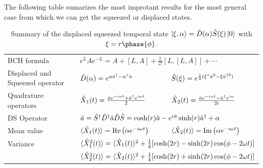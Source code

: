 The following table sumarizes the most improtant 
results for the most general case from which we can get the squeezed or displaced states.
\begin{table}[htbp]
    \caption{Summary of the displaced squeezed temporal state $\left|\xi,\alpha\right\rangle=\hat{D}(\alpha)\hat{S}(\xi)\left|0\right\rangle$ with $\xi=r\phase{\phi}$.}
    \centering
    \begin{tabular}{l|ll}
        BCH formula&\multicolumn{2}{l}{$e^LAe^{-L}=A+[L,A]+\frac{1}{2!}[L,[L,A]]+\cdots$}\\
        Displaced and Squeezed operator&$\hat{D}(\alpha)=e^{\alpha\hat{a}^\dagger-\alpha^*\hat{a}}$&$\hat{S}(\xi)=e^{\frac{1}{2}(\xi^*\hat{a}^2-\xi\hat{a}^{\dagger2})}$\\
        Quadrature operators&$\hat{X}_1(t)=\frac{\hat{a} e^{-i\omega t}+\hat{a}^\dagger e^{i\omega t}}{2}$&$\hat{X}_2(t)=\frac{\hat{a} e^{-i\omega t}-\hat{a}^\dagger e^{i\omega}}{2i}$\\
        DS Operator&\multicolumn{2}{l}{$\tilde{a}=\hat{S}^\dagger\hat{D}^\dagger\hat{a}\hat{D}\hat{S}=\cosh(r)\hat{a}-e^{i\phi}\sinh(r)\hat{a}^\dagger+\alpha$}\\
        Mean value&$\langle\hat{X}_1(t)\rangle=\text{Re}\left(\alpha e^{-i\omega t}\right)$&$\langle\hat{X}_2(t)\rangle=\text{Im}\left(\alpha e^{-i\omega t}\right)$\\
        Variance&\multicolumn{2}{l}{$\langle\hat{X}_1^2(t)\rangle=\langle\hat{X}_1(t)\rangle^2+\frac{1}{4}[\cosh(2r)-\sinh(2r)\cos(\phi-2\omega t)]$}\\
        &\multicolumn{2}{l}{$\langle\hat{X}_2^2(t)\rangle=\langle\hat{X}_2(t)\rangle^2+\frac{1}{4}[\cosh(2r)+\sinh(2r)\cos(\phi-2\omega t)]$}
    \end{tabular}
\end{table}